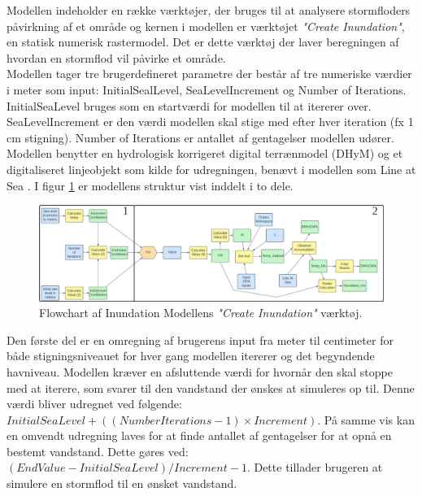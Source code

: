Modellen indeholder en række værktøjer, der bruges til at analysere stormfloders påvirkning af et område og kernen i modellen er værktøjet \textit{"Create Inundation"}, en statisk numerisk rastermodel. Det er dette værktøj der laver beregningen af hvordan en stormflod vil påvirke et område.\\ 
Modellen tager tre brugerdefineret parametre der består af tre numeriske værdier i meter som input: InitialSealLevel, SeaLevelIncrement og Number of Iterations. InitialSeaLevel bruges som en startværdi for modellen til at itererer over. SeaLevelIncrement er den værdi modellen skal stige med efter hver iteration (fx 1 cm stigning). Number of Iterations er antallet af gentagelser modellen udører. \\
Modellen benytter en hydrologisk korrigeret digital terrænmodel (DHyM) og et digitaliseret linjeobjekt som kilde for udregningen, benævt i modellen som Line at Sea \citep{balstrom_kirby_inundation}. I figur \ref{Figur: Create Inundation} er modellens struktur vist inddelt i to dele.
\begin{figure}[H]
    \centering
    \includegraphics[width=1\linewidth]{images/teori/inundation_model_separated.jpg}
    \caption{Flowchart af Inundation Modellens \textit{"Create Inundation"} værktøj.}
    \label{Figur: Create Inundation}
\end{figure}
Den første del er en omregning af brugerens input fra meter til centimeter for både stigningsniveauet for hver gang modellen itererer og det begyndende havniveau. Modellen kræver en afsluttende værdi for hvornår den skal stoppe med at iterere, som svarer til den vandstand der ønskes at simuleres op til. Denne værdi bliver udregnet ved følgende: \\$InitialSeaLevel + ((NumberIterations - 1)\times Increment)$. På samme vis kan en omvendt udregning laves for at finde antallet af gentagelser for at opnå en bestemt vandstand. Dette gøres ved: $(EndValue - InitialSeaLevel) / Increment - 1$. Dette tillader brugeren at simulere en stormflod til en ønsket vandstand.\\

